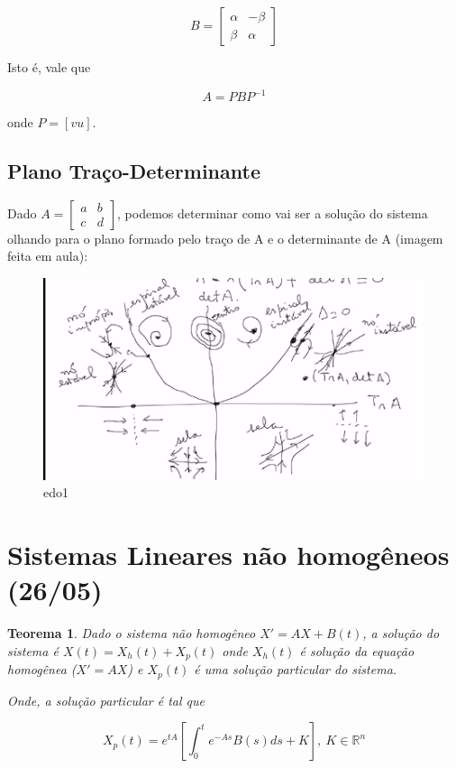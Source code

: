 \documentclass[12pt]{article}
\newtheorem{theorem}{Teorema}[section]
\begin{document}
$$B = \left [ \begin{array}{cc}
    \alpha & - \beta \\
    \beta & \alpha 
\end{array} \right ]$$

Isto é, vale que

$$A = PBP^{-1}$$

onde $P = [v u]$.


\subsection*{Plano Traço-Determinante}
Dado $A = \left [ \begin{array}{cc}
    a & b \\
    c & d
\end{array} \right ]$, podemos determinar como vai ser a solução do sistema olhando para o plano formado pelo traço de A e o determinante de A (imagem feita em aula):

\begin{figure}[h]
    \centering
    \includegraphics{edo1.png}
    \caption{edo1}
    \label{fig:my_label}
\end{figure}


\section{Sistemas Lineares não homogêneos (26/05)}
\begin{theorem}
    Dado o sistema não homogêneo $X' = AX + B(t)$, a solução do sistema é $X(t) = X_h(t) + X_p(t)$ onde $X_h(t)$ é solução da equação homogênea ($X' = A X$) e $X_p(t)$ é uma solução particular do sistema.
    
    Onde, a solução particular é tal que
    
    $$X_p(t) = e^{t A} \left [ \int_0^t e^{- A s} B(s) d s + K \right ], \ K \in \mathbb{R}^n$$
\end{theorem}
\end{document}
